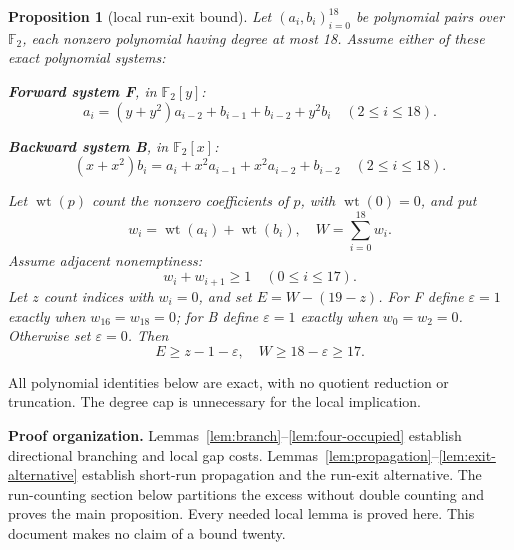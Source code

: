 \documentclass{article}
\newtheorem{proposition}{Proposition}
\DeclareMathOperator{\wt}{wt}
\newcommand{\Ftwo}{\mathbb{F}_2}
\begin{document}
\begin{proposition}[local run-exit bound]\label{prop:run-exit}
  Let \((a_i, b_i)_{i=0}^{18}\) be polynomial pairs over \(\Ftwo\), each nonzero polynomial
  having degree at most 18. Assume either of these exact polynomial systems:

  \textbf{Forward system F}, in \(\Ftwo[y]\):
  \begin{equation}\label{eq:forward}
    a_i = (y + y^2) a_{i-2} + b_{i-1} + b_{i-2} + y^2 b_i
    \quad (2 \le i \le 18).
  \end{equation}

  \textbf{Backward system B}, in \(\Ftwo[x]\):
  \begin{equation}\label{eq:backward}
    (x + x^2) b_i = a_i + x^2 a_{i-1} + x^2 a_{i-2} + b_{i-2}
    \quad (2 \le i \le 18).
  \end{equation}

  Let \(\wt(p)\) count the nonzero coefficients of \(p\), with \(\wt(0) = 0\), and put
  \begin{equation}
    w_i = \wt(a_i) + \wt(b_i), \quad W = \sum_{i=0}^{18} w_i.
  \end{equation}
  Assume adjacent nonemptiness:
  \begin{equation}\label{eq:adjacent}
    w_i + w_{i+1} \ge 1 \quad (0 \le i \le 17).
  \end{equation}
  Let \(z\) count indices with \(w_i = 0\), and set \(E = W - (19 - z)\). For F define
  \(\varepsilon = 1\) exactly when \(w_{16} = w_{18} = 0\); for B define \(\varepsilon = 1\)
  exactly when \(w_0 = w_2 = 0\). Otherwise set \(\varepsilon = 0\). Then
  \begin{equation}\label{eq:main-bound}
    E \ge z - 1 - \varepsilon, \quad W \ge 18 - \varepsilon \ge 17.
  \end{equation}
\end{proposition}

All polynomial identities below are exact, with no quotient reduction or truncation. The
degree cap is unnecessary for the local implication.

\textbf{Proof organization.} Lemmas~\ref{lem:branch}--\ref{lem:four-occupied} establish
directional branching and local gap costs.
Lemmas~\ref{lem:propagation}--\ref{lem:exit-alternative} establish short-run propagation and
the run-exit alternative. The run-counting section below partitions the excess without double
counting and proves the main proposition. Every needed local lemma is proved here. This
document makes no claim of a bound twenty.
\end{document}
